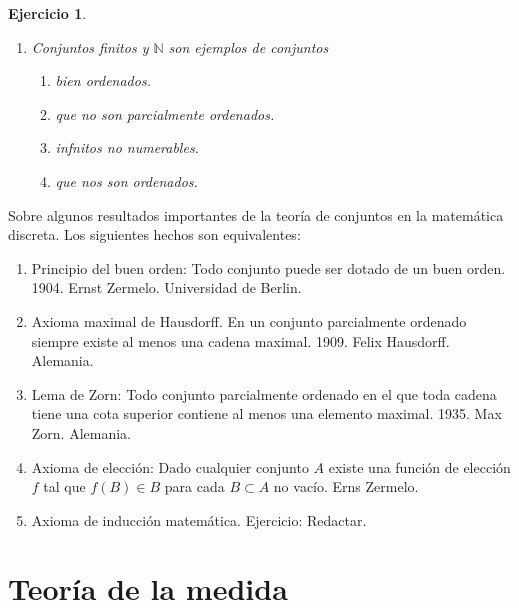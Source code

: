 \documentclass[twoside,12pt,a4 paper,openright]{book}
\newtheorem{ejer}[claim]{Ejercicio}
\begin{document}
\begin{ejer}
\begin{enumerate}
\newpage



\item Conjuntos finitos y $\mathbb N$ son ejemplos de conjuntos  
          {\small
    \begin{enumerate}
\item[\textcolor{red}{$\bullet$}]{} bien ordenados. 
\item[\textcolor{blue}{$\bullet$}] {} que no son  parcialmente ordenados.
\item[\textcolor{yellow}{$\bullet$}] {}  infnitos no numerables.
\item[\textcolor{green}{$\bullet$}] {} que nos son  ordenados.
  \end{enumerate}
}





\end{enumerate}
\end{ejer}


\newpage
 
 Sobre algunos resultados importantes de la teor\'ia de conjuntos en la matem\'atica discreta.  Los siguientes hechos son equivalentes: 
\begin{enumerate}
\item  Principio del buen orden: Todo conjunto puede ser dotado  de un buen orden. 1904. Ernst Zermelo. Universidad de Berlin.    

\item Axioma maximal de Hausdorff. En un conjunto parcialmente ordenado siempre existe al menos una cadena maximal. 1909. Felix Hausdorff. Alemania.

\item Lema de Zorn: Todo conjunto parcialmente ordenado en el que toda cadena tiene una cota superior contiene al menos una elemento maximal. 1935. Max Zorn. Alemania.

\item Axioma de elecci\'on: Dado cualquier conjunto $A$ existe una funci\'on de elecci\'on  $f$ tal que $f(B)\in B$ para cada $B\subset A$ no vac\'io. Erns Zermelo.  

\item Axioma de inducci\'on matem\'atica. Ejercicio: Redactar.  
\end{enumerate}
 




\chapter{Teor\'ia de la medida} 
\end{document}
